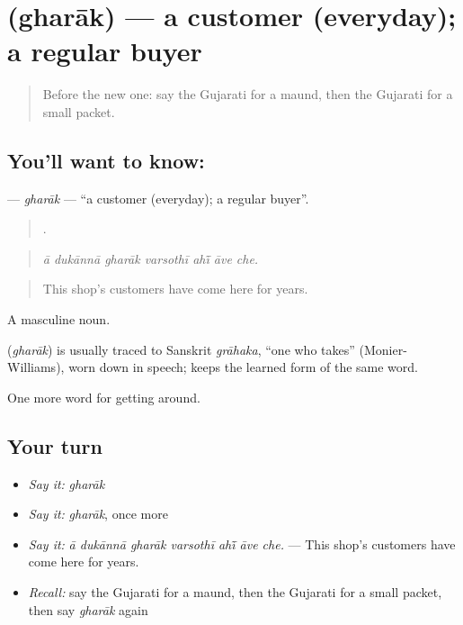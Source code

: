 \section[\texorpdfstring{\gu{ઘરાક} (gharāk)}{ઘરાક (gharāk)}]{ (gharāk) — a customer (everyday); a regular buyer}

\label{lesson:GU-C430-gharak}



\begin{quote}
Before the new one: say the Gujarati for a maund, then the Gujarati for a small packet.
\end{quote}

\subsection*{You'll want to know: }
\textbf{} — \emph{gharāk} — \textquotedblleft{}a customer (everyday); a regular buyer\textquotedblright{}.

\begin{quote}
      .
\end{quote}

\begin{quote}
\emph{ā dukānnā gharāk varsothī ahī̃ āve che.}
\end{quote}

\begin{quote}
This shop's customers have come here for years.
\end{quote}

A masculine noun.

\begin{cousinweb}
\textbf{} (\emph{gharāk}) is usually traced to Sanskrit \emph{grāhaka}, \textquotedblleft{}one who takes\textquotedblright{} (Monier-Williams), worn down in speech;  keeps the learned form of the same word.
\end{cousinweb}

\begin{grammarlens}[title={What you've built}]
One more word for getting around.
\end{grammarlens}

\subsection*{Your turn}
\begin{itemize}
\raggedright
  \item \emph{Say it:} \emph{gharāk}
  \item \emph{Say it:} \emph{gharāk}, once more
  \item \emph{Say it:} \emph{ā dukānnā gharāk varsothī ahī̃ āve che.} — This shop's customers have come here for years.
  \item \emph{Recall:} say the Gujarati for a maund, then the Gujarati for a small packet, then say \emph{gharāk} again
\end{itemize}

